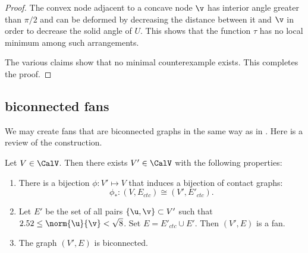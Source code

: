 \begin{proof}
The convex node adjacent to a concave node $\v$ has interior angle greater
than $\pi/2$ and can be deformed by decreasing the distance between it
and $\v$ in order to decrease the solid angle of $U$.  This shows that the
function $\tau$ has no local minimum among such arrangements.


The various claims show that no minimal counterexample exists.  This
completes the proof.
\end{proof}

\subsection{biconnected fans}

We may create  fans that are biconnected graphs in the same way as in
\cite{Hales:2006:DCG}.  Here is a review
of the construction.



\begin{lemma}\label{lemma:V'-bi} 
Let $V\in \CalV$.  Then there exists $V'\in \CalV$ with
  the following  properties:
\begin{enumerate}\wasitemize 
\item There is a bijection $\phi:V'\mapsto V$ that induces a bijection
  of contact graphs:
\[
\phi_*:(V,E_{ctc}) \cong (V',E'_{ctc}).
\]
\item Let $E'$ be the set of all pairs $\{\u,\v\}\subset V'$
  such that $2.52\le\norm{\u}{\v} <\sqrt8$.  Set $E =
  E'_{ctc}\cup E'$.  Then $(V',E)$ is a fan.
\item The graph $(V',E)$ is biconnected.
\end{enumerate}\wasitemize 
\end{lemma}

